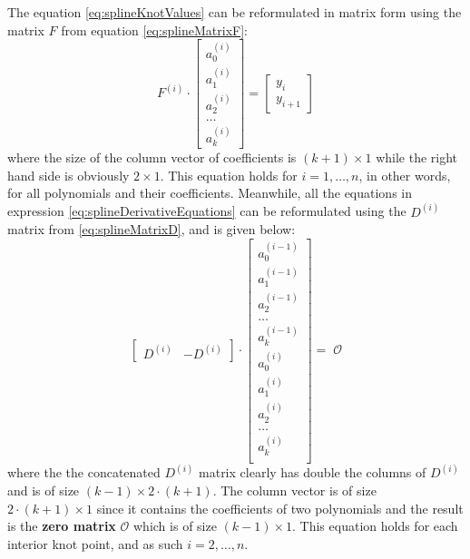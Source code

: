 \documentclass[12pt, a4paper]{article}
\begin{document}
The equation \eqref{eq:splineKnotValues} can be reformulated in matrix form using the matrix \( F \) from equation \eqref{eq:splineMatrixF}:
\begin{equation} \label{eq:matrixSplineKnotValues}
    F^{(i)}
    \cdot
    \begin{bmatrix}
    a_0^{(i)} \\
    a_1^{(i)} \\
    a_2^{(i)} \\
    \ldots \\
    a_k^{(i)}
    \end{bmatrix}
    = 
    \begin{bmatrix}
    y_i \\
    y_{i+1}
    \end{bmatrix}
\end{equation}
\noindent where the size of the column vector of coefficients is \((k+1)\times 1\) while the right hand side is obviously \( 2 \times 1\). This equation holds for \( i=1,\ldots,n\), in other words, for all polynomials and their coefficients. Meanwhile, all the equations in expression \eqref{eq:splineDerivativeEquations} can be reformulated using the \( D^{(i)} \) matrix from \eqref{eq:splineMatrixD}, and is given below: 
\begin{equation} \label{eq:matrixSplineDerivativeEquation}
    \begin{bmatrix}
    D^{(i)} & -D^{(i)}
    \end{bmatrix}
    \cdot
    \begin{bmatrix}
    a_0^{(i-1)} \\
    a_1^{(i-1)} \\
    a_2^{(i-1)} \\
    \ldots \\
    a_k^{(i-1)} \\
    a_0^{(i)} \\
    a_1^{(i)} \\
    a_2^{(i)} \\
    \ldots \\
    a_k^{(i)} \\
    \end{bmatrix}
    = \;
    \mathcal{O}
\end{equation}
where the the concatenated \( D^{(i)} \) matrix clearly has double the columns of \( D^{(i)} \) and is of size \((k-1)\times2\cdot(k+1)\). The column vector is of size \( 2\cdot(k+1)\times 1 \) since it contains the coefficients of two polynomials and the result is the \textbf{zero matrix} \(\mathcal{O}\) which is of size \((k-1)\times 1\). This equation holds for each interior knot point, and as such \( i=2,\ldots,n\).\par
\end{document}
